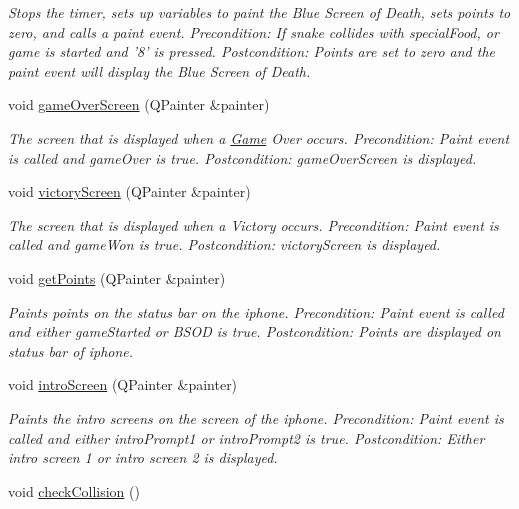 \begin{DoxyCompactItemize}
\begin{DoxyCompactList}\small\item\em \-Stops the timer, sets up variables to paint the \-Blue \-Screen of \-Death, sets points to zero, and calls a paint event. \-Precondition\-: \-If snake collides with special\-Food, or game is started and '8' is pressed. \-Postcondition\-: \-Points are set to zero and the paint event will display the \-Blue \-Screen of \-Death. \end{DoxyCompactList}\item 
void \hyperlink{classGame_a878615d81c26a1c5b62992f741f63e6d}{game\-Over\-Screen} (\-Q\-Painter \&painter)
\begin{DoxyCompactList}\small\item\em \-The screen that is displayed when a \hyperlink{classGame}{\-Game} \-Over occurs. \-Precondition\-: \-Paint event is called and game\-Over is true. \-Postcondition\-: game\-Over\-Screen is displayed. \end{DoxyCompactList}\item 
void \hyperlink{classGame_acdc0eaef5b29ea5d73edf8c908cf8dc7}{victory\-Screen} (\-Q\-Painter \&painter)
\begin{DoxyCompactList}\small\item\em \-The screen that is displayed when a \-Victory occurs. \-Precondition\-: \-Paint event is called and game\-Won is true. \-Postcondition\-: victory\-Screen is displayed. \end{DoxyCompactList}\item 
void \hyperlink{classGame_ad8ec719e40e94a3a1a059fd2f25b5dd1}{get\-Points} (\-Q\-Painter \&painter)
\begin{DoxyCompactList}\small\item\em \-Paints points on the status bar on the iphone. \-Precondition\-: \-Paint event is called and either game\-Started or \-B\-S\-O\-D is true. \-Postcondition\-: \-Points are displayed on status bar of iphone. \end{DoxyCompactList}\item 
void \hyperlink{classGame_a34e40db4bb49df422db3b120de17e5b6}{intro\-Screen} (\-Q\-Painter \&painter)
\begin{DoxyCompactList}\small\item\em \-Paints the intro screens on the screen of the iphone. \-Precondition\-: \-Paint event is called and either intro\-Prompt1 or intro\-Prompt2 is true. \-Postcondition\-: \-Either intro screen 1 or intro screen 2 is displayed. \end{DoxyCompactList}\item 
\hypertarget{classGame_a71802e92f514d4b79f3168b70d7217a6}{void \hyperlink{classGame_a71802e92f514d4b79f3168b70d7217a6}{check\-Collision} ()}\label{classGame_a71802e92f514d4b79f3168b70d7217a6}


\end{DoxyCompactItemize}
